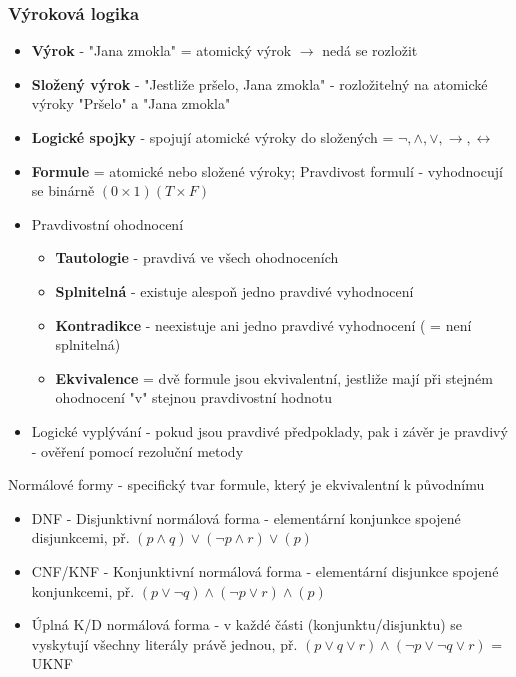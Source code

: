 \documentclass[10pt,a4paper]{article}
\begin{document}
\subsubsection{Výroková logika}
\begin{itemize}
\item \textbf{Výrok} - "Jana zmokla" = atomický výrok $\rightarrow$ nedá se rozložit
\item \textbf{Složený výrok} - "Jestliže pršelo, Jana zmokla" - rozložitelný na atomické výroky "Pršelo" a "Jana zmokla"
\item \textbf{Logické spojky} - spojují atomické výroky do složených = $\lnot ,\wedge ,\vee ,\rightarrow,\leftrightarrow$
\item \textbf{Formule} = atomické nebo složené výroky; Pravdivost formulí - vyhodnocují se binárně $(0 \times 1) (T \times F)$
\item Pravdivostní ohodnocení
\begin{itemize}
\item \textbf{Tautologie} - pravdivá ve všech ohodnoceních
\item \textbf{Splnitelná} - existuje alespoň jedno pravdivé vyhodnocení
\item \textbf{Kontradikce} - neexistuje ani jedno pravdivé vyhodnocení ( = není splnitelná)
\item \textbf{Ekvivalence} = dvě formule jsou ekvivalentní, jestliže mají při stejném ohodnocení "v" stejnou pravdivostní hodnotu
\end{itemize}
\item Logické vyplývání - pokud jsou pravdivé předpoklady, pak i závěr je pravdivý - ověření pomocí rezoluční metody
\end{itemize}
Normálové formy - specifický tvar formule, který je ekvivalentní k původnímu
\begin{itemize}
\item DNF - Disjunktivní normálová forma - elementární konjunkce spojené disjunkcemi, př. $(p\wedge q)\vee (\lnot p\wedge r)\vee (p)$
\item CNF/KNF - Konjunktivní normálová forma - elementární disjunkce spojené konjunkcemi, př. $(p\vee \lnot q)\wedge (\lnot p\vee r)\wedge (p)$
\item Úplná K/D normálová forma - v každé části (konjunktu/disjunktu) se vyskytují všechny literály právě jednou, př. $(p\vee q\vee r)\wedge (\lnot p\vee \lnot q\vee r)$ = UKNF
\end{itemize}
\end{document}
